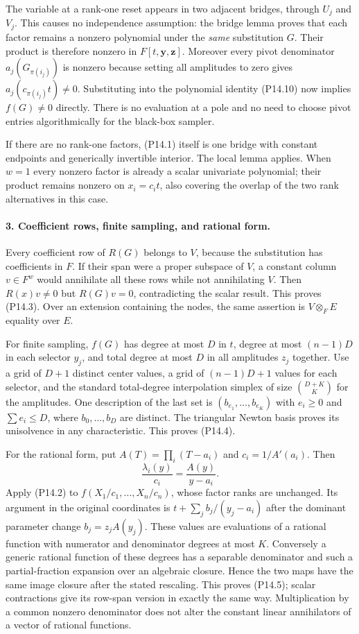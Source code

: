 \documentclass[11pt,a4paper]{article}
\theoremstyle{definition}\newtheorem{definition}{Definition}
\begin{document}
The variable at a rank-one reset appears in two adjacent
bridges, through $U_j$ and $V_j$. This causes no independence
assumption: the bridge lemma proves that each factor remains
a nonzero polynomial under the \emph{same} substitution $G$.
Their product is therefore nonzero in
$F[t,\mathbf y,\mathbf z]$. Moreover every pivot denominator
$a_j(G_{\pi(i_j)})$ is nonzero because setting all amplitudes
to zero gives $a_j(c_{\pi(i_j)}t)\ne0$. Substituting into the
polynomial identity (P14.10) now implies $f(G)\ne0$ directly.
There is no evaluation at a pole and no need to choose pivot
entries algorithmically for the black-box sampler.

If there are no rank-one factors, (P14.1) itself is one bridge
with constant endpoints and generically invertible interior.
The local lemma applies. When $w=1$ every nonzero factor is
already a scalar univariate polynomial; their product remains
nonzero on $x_i=c_it$, also covering the overlap of the two
rank alternatives in this case.

\paragraph{3. Coefficient rows, finite sampling, and rational form.}
Every coefficient row of $R(G)$ belongs to $V$, because the
substitution has coefficients in $F$. If their span were a
proper subspace of $V$, a constant column $v\in F^w$ would
annihilate all these rows while not annihilating $V$. Then
$R(x)v\ne0$ but $R(G)v=0$, contradicting the scalar result.
This proves (P14.3). Over an extension containing the nodes,
the same assertion is $V\otimes_F E$ equality over $E$.

For finite sampling, $f(G)$ has degree at most $D$ in $t$,
degree at most $(n-1)D$ in each selector $y_j$, and total degree
at most $D$ in all amplitudes $z_j$ together. Use a grid of
$D+1$ distinct center values, a grid of $(n-1)D+1$ values for
each selector, and the standard total-degree interpolation
simplex of size $\binom{D+K}{K}$ for the amplitudes. One
description of the last set is
$(b_{e_1},\ldots,b_{e_K})$ with $e_i\geq0$ and
$\sum e_i\leq D$, where $b_0,\ldots,b_D$ are distinct.
The triangular Newton basis proves its unisolvence in any
characteristic. This proves (P14.4).

For the rational form, put $A(T)=\prod_i(T-a_i)$ and
$c_i=1/A'(a_i)$. Then
\[
 \frac{\lambda_i(y)}{c_i}=\frac{A(y)}{y-a_i}.
 \tag{P14.11}
\]
Apply (P14.2) to $f(X_1/c_1,\ldots,X_n/c_n)$, whose factor
ranks are unchanged. Its argument in the original coordinates
is $t+\sum_j b_j/(y_j-a_i)$ after the dominant parameter
change $b_j=z_jA(y_j)$. These values are evaluations of a
rational function with numerator and denominator degrees at
most $K$. Conversely a generic rational function of these
degrees has a separable denominator and such a partial-fraction
expansion over an algebraic closure. Hence the two maps have
the same image closure after the stated rescaling. This
proves (P14.5); scalar contractions give its row-span version
in exactly the same way. Multiplication by a common nonzero
denominator does not alter the constant linear annihilators
of a vector of rational functions.
\end{document}
